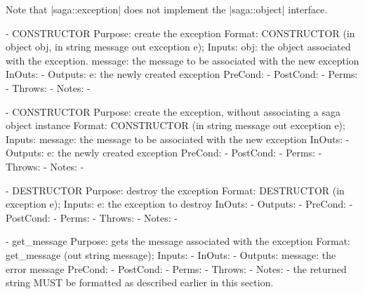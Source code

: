     Note that |saga::exception| does not implement the
    |saga::object| interface.
 
 \begin{myspec}
    - CONSTRUCTOR
      Purpose:  create the exception
      Format:   CONSTRUCTOR   (in  object         obj,
                               in  string         message
                               out exception      e);
      Inputs:   obj:           the object associated with the
                               exception.
                message:       the message to be associated 
                               with the new exception
      InOuts:   -
      Outputs:  e:             the newly created exception
      PreCond:  -
      PostCond: -
      Perms:    -
      Throws:   -
      Notes:    -
 
 
    - CONSTRUCTOR
      Purpose:  create the exception,  without associating 
                a saga object instance
      Format:   CONSTRUCTOR   (in  string         message
                               out exception      e);
      Inputs:   message:       the message to be associated 
                               with the new exception
      InOuts:   -
      Outputs:  e:             the newly created exception
      PreCond:  -
      PostCond: -
      Perms:    -
      Throws:   -
      Notes:    -
 
 
    - DESTRUCTOR
      Purpose:  destroy the exception
      Format:   DESTRUCTOR    (in  exception e);
      Inputs:   e:             the exception to destroy
      InOuts:   -
      Outputs:  -
      PreCond:  -
      PostCond: -
      Perms:    -
      Throws:   -
      Notes:    -
 
 
    - get_message
      Purpose:  gets the message associated with the exception    
      Format:   get_message   (out string message);
      Inputs:   -
      InOuts:   -
      Outputs:  message:       the error message
      PreCond:  -
      PostCond: -
      Perms:    -
      Throws:   -
      Notes:    - the returned string MUST be formatted as
                  described earlier in this section.
 

\end{myspec}
